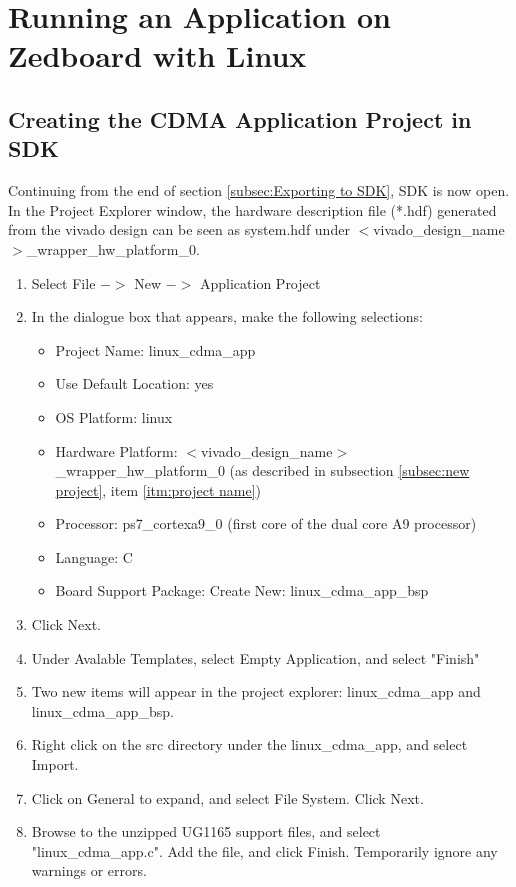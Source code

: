 \documentclass[12pt]{article}
\begin{document}
\section{Running an Application on Zedboard with Linux}

\subsection{Creating the CDMA Application Project in SDK}
\label{subsec:cdma_project}
Continuing from the end of section \ref{subsec:Exporting to SDK}, SDK is now open.  In the Project Explorer window, the hardware description file (*.hdf) generated from the vivado design can be seen as system.hdf under $<$vivado\_design\_name$>$\_wrapper\_hw\_platform\_0.
\label{par:SDK Open}

\begin{enumerate}
\item Select File $->$ New $->$ Application Project
\item In the dialogue box that appears, make the following selections:
\begin{itemize}
\item Project Name: linux\_cdma\_app
\item Use Default Location: yes
\item OS Platform: linux
\item Hardware Platform: $<$vivado\_design\_name$>$\_wrapper\_hw\_platform\_0 (as described in subsection \ref{subsec:new project}, item \ref{itm:project name})
\item Processor: ps7\_cortexa9\_0 (first core of the dual core A9 processor)
\item Language: C
\item Board Support Package: Create New: linux\_cdma\_app\_bsp
\end{itemize}
\item Click Next.  
\item Under Avalable Templates, select Empty Application, and select "Finish"
\item Two new items will appear in the project explorer: linux\_cdma\_app and linux\_cdma\_app\_bsp.
\item Right click on the src directory under the linux\_cdma\_app, and select Import.
\item Click on General to expand, and select File System.  Click Next.
\item Browse to the unzipped UG1165 support files, and select "linux\_cdma\_app.c".  Add the file, and click Finish.  Temporarily ignore any warnings or errors.

\end{enumerate}
\end{document}
